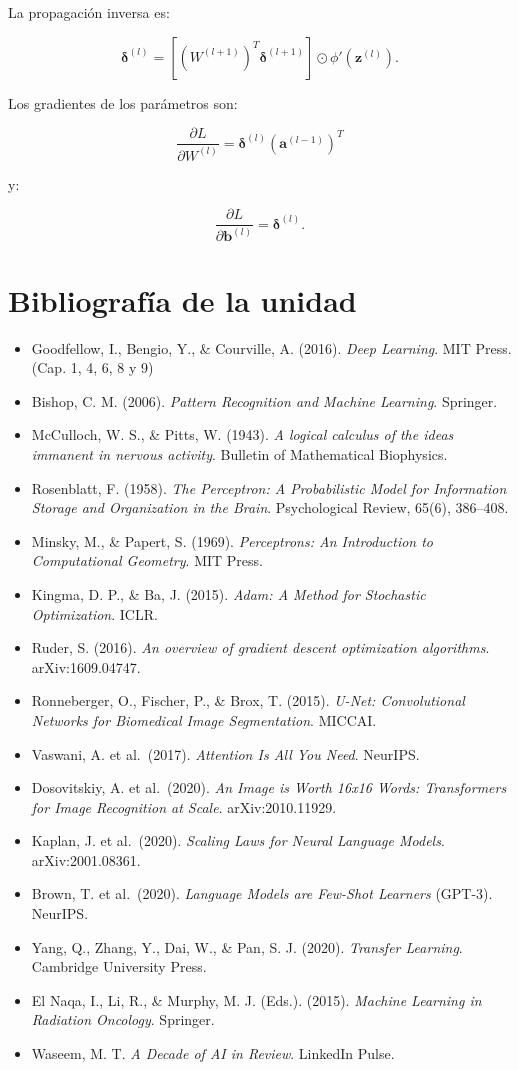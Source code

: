 \documentclass[
  letterpaper,
  DIV=11,
  numbers=noendperiod]{scrartcl}
\providecommand{\tightlist}{%
  \setlength{\itemsep}{0pt}\setlength{\parskip}{0pt}}
\begin{document}
La propagación inversa es:

\[
\boldsymbol\delta^{(l)}
=
\left[
(W^{(l+1)})^T
\boldsymbol\delta^{(l+1)}
\right]
\odot
\phi'(\mathbf z^{(l)}).
\]

Los gradientes de los parámetros son:

\[
\boxed{
\frac{\partial L}{\partial W^{(l)}}
=
\boldsymbol\delta^{(l)}
(\mathbf a^{(l-1)})^T
}
\]

y:

\[
\boxed{
\frac{\partial L}{\partial\mathbf b^{(l)}}
=
\boldsymbol\delta^{(l)}.
}
\]

\section{Bibliografía de la unidad}\label{bibliografuxeda-de-la-unidad}

\begin{itemize}
\tightlist
\item
  Goodfellow, I., Bengio, Y., \& Courville, A. (2016). \emph{Deep
  Learning}. MIT Press. (Cap. 1, 4, 6, 8 y 9)
\item
  Bishop, C. M. (2006). \emph{Pattern Recognition and Machine Learning}.
  Springer.
\item
  McCulloch, W. S., \& Pitts, W. (1943). \emph{A logical calculus of the
  ideas immanent in nervous activity}. Bulletin of Mathematical
  Biophysics.
\item
  Rosenblatt, F. (1958). \emph{The Perceptron: A Probabilistic Model for
  Information Storage and Organization in the Brain}. Psychological
  Review, 65(6), 386--408.
\item
  Minsky, M., \& Papert, S. (1969). \emph{Perceptrons: An Introduction
  to Computational Geometry}. MIT Press.
\item
  Kingma, D. P., \& Ba, J. (2015). \emph{Adam: A Method for Stochastic
  Optimization}. ICLR.
\item
  Ruder, S. (2016). \emph{An overview of gradient descent optimization
  algorithms}. arXiv:1609.04747.
\item
  Ronneberger, O., Fischer, P., \& Brox, T. (2015). \emph{U-Net:
  Convolutional Networks for Biomedical Image Segmentation}. MICCAI.
\item
  Vaswani, A. et al.~(2017). \emph{Attention Is All You Need}. NeurIPS.
\item
  Dosovitskiy, A. et al.~(2020). \emph{An Image is Worth 16x16 Words:
  Transformers for Image Recognition at Scale}. arXiv:2010.11929.
\item
  Kaplan, J. et al.~(2020). \emph{Scaling Laws for Neural Language
  Models}. arXiv:2001.08361.
\item
  Brown, T. et al.~(2020). \emph{Language Models are Few-Shot Learners}
  (GPT-3). NeurIPS.
\item
  Yang, Q., Zhang, Y., Dai, W., \& Pan, S. J. (2020). \emph{Transfer
  Learning}. Cambridge University Press.
\item
  El Naqa, I., Li, R., \& Murphy, M. J. (Eds.). (2015). \emph{Machine
  Learning in Radiation Oncology}. Springer.
\item
  Waseem, M. T. \emph{A Decade of AI in Review}. LinkedIn Pulse.
\end{itemize}
\end{document}
